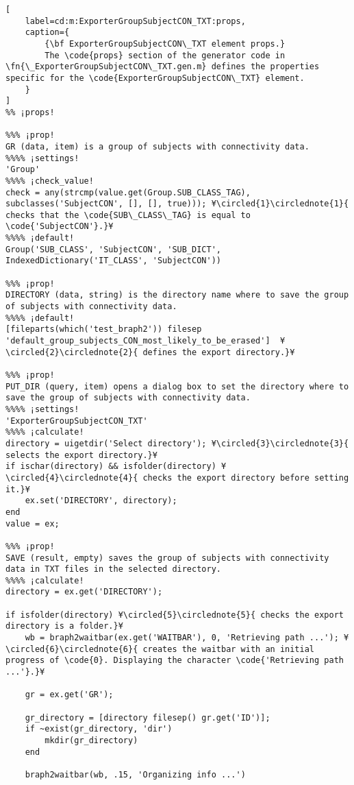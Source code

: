 \documentclass{tufte-handout}
\begin{document}
\begin{lstlisting}[
	label=cd:m:ExporterGroupSubjectCON_TXT:props,
	caption={
		{\bf ExporterGroupSubjectCON\_TXT element props.}
		The \code{props} section of the generator code in \fn{\_ExporterGroupSubjectCON\_TXT.gen.m} defines the properties specific for the \code{ExporterGroupSubjectCON\_TXT} element.
	}
]
%% ¡props!

%%% ¡prop!
GR (data, item) is a group of subjects with connectivity data. 
%%%% ¡settings!
'Group'
%%%% ¡check_value!
check = any(strcmp(value.get(Group.SUB_CLASS_TAG), subclasses('SubjectCON', [], [], true))); ¥\circled{1}\circlednote{1}{ checks that the \code{SUB\_CLASS\_TAG} is equal to \code{'SubjectCON'}.}¥
%%%% ¡default!
Group('SUB_CLASS', 'SubjectCON', 'SUB_DICT', IndexedDictionary('IT_CLASS', 'SubjectCON'))

%%% ¡prop!
DIRECTORY (data, string) is the directory name where to save the group of subjects with connectivity data.
%%%% ¡default!
[fileparts(which('test_braph2')) filesep 'default_group_subjects_CON_most_likely_to_be_erased']  ¥\circled{2}\circlednote{2}{ defines the export directory.}¥

%%% ¡prop!
PUT_DIR (query, item) opens a dialog box to set the directory where to save the group of subjects with connectivity data.
%%%% ¡settings!
'ExporterGroupSubjectCON_TXT'
%%%% ¡calculate!
directory = uigetdir('Select directory'); ¥\circled{3}\circlednote{3}{ selects the export directory.}¥
if ischar(directory) && isfolder(directory) ¥\circled{4}\circlednote{4}{ checks the export directory before setting it.}¥
	ex.set('DIRECTORY', directory);
end
value = ex;

%%% ¡prop!
SAVE (result, empty) saves the group of subjects with connectivity data in TXT files in the selected directory.
%%%% ¡calculate!
directory = ex.get('DIRECTORY');

if isfolder(directory) ¥\circled{5}\circlednote{5}{ checks the export directory is a folder.}¥
    wb = braph2waitbar(ex.get('WAITBAR'), 0, 'Retrieving path ...'); ¥\circled{6}\circlednote{6}{ creates the waitbar with an initial progress of \code{0}. Displaying the character \code{'Retrieving path ...'}.}¥
    
    gr = ex.get('GR');

    gr_directory = [directory filesep() gr.get('ID')];
    if ~exist(gr_directory, 'dir')
        mkdir(gr_directory)
    end
    
    braph2waitbar(wb, .15, 'Organizing info ...')
    

\end{lstlisting}
\end{document}
